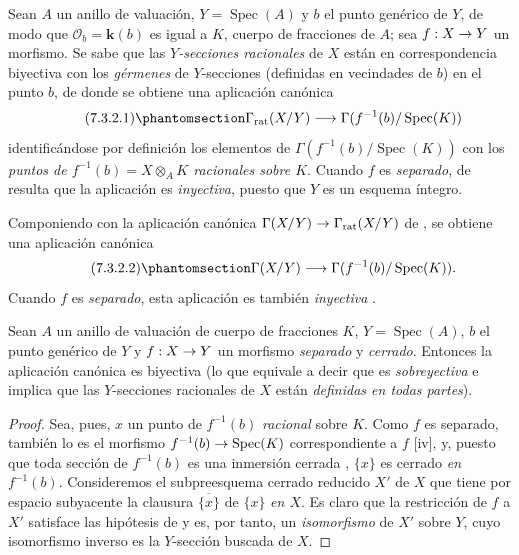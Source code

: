 \documentclass[oneside,10pt]{amsart}
\makeatletter
\newcommand{\ega@arrow}[2]{\mathchoice{#1}{#2}{#2}{#2}}
\renewcommand{\to}{\ega@arrow{\longrightarrow}{\rightarrow}}
\let\EGAOriginalLabel\label
\renewcommand{\label}[1]{\phantomsection\EGAOriginalLabel{#1}}
\makeatother
\begin{document}
\begin{env}[7.3.2]
\label{II.7.3.2-fr}
Sean $A$ un anillo de valuación, $Y=\operatorname{Spec}(A)$ y $b$ el punto genérico de $Y$, de modo que $\mathcal{O}_b=\boldsymbol{k}(b)$ es igual a $K$, cuerpo de fracciones de $A$;
sea $f:X\to Y$ un morfismo.
Se sabe  que las \emph{$Y$-secciones racionales} de $X$ están en correspondencia biyectiva con los \emph{gérmenes} de $Y$-secciones (definidas en vecindades de $b$) en el punto $b$, de donde se obtiene una aplicación canónica
\[
\tag{7.3.2.1}
\label{II.7.3.2.1-fr}
\Gamma_{\mathrm{rat}}(X/Y)\longrightarrow
\Gamma(f^{-1}(b)/\operatorname{Spec}(K))
\]
identificándose por definición  los elementos de $\Gamma(f^{-1}(b)/\operatorname{Spec}(K))$ con los \emph{puntos de $f^{-1}(b)=X\otimes_AK$ racionales sobre $K$}.
Cuando $f$ es \emph{separado}, de  resulta que la aplicación  es \emph{inyectiva}, puesto que $Y$ es un esquema íntegro.

Componiendo  con la aplicación canónica
$\Gamma(X/Y)\to\Gamma_{\mathrm{rat}}(X/Y)$
de , se obtiene una aplicación canónica
\[
\tag{7.3.2.2}
\label{II.7.3.2.2-fr}
\Gamma(X/Y)\longrightarrow \Gamma(f^{-1}(b)/\operatorname{Spec}(K)).
\]
Cuando $f$ es \emph{separado}, esta aplicación es también \emph{inyectiva} .
\end{env}


\begin{proposition}[7.3.3]
\label{II.7.3.3-fr}
Sean $A$ un anillo de valuación de cuerpo de fracciones $K$, $Y=\operatorname{Spec}(A)$, $b$ el punto genérico de $Y$ y $f:X\to Y$ un morfismo \emph{separado} y \emph{cerrado}.
Entonces la aplicación canónica  es biyectiva \textup{(lo que equivale a decir que es \emph{sobreyectiva} e implica que las $Y$-secciones racionales de $X$ están \emph{definidas en todas partes})}.
\end{proposition}

\begin{proof}
Sea, pues, $x$ un punto de $f^{-1}(b)$ \emph{racional} sobre $K$.
Como $f$ es separado, también lo es el morfismo $f^{-1}(b)\to\operatorname{Spec}(K)$ correspondiente a $f$ [iv], y, puesto que toda sección de $f^{-1}(b)$ es una inmersión cerrada , $\{x\}$ es cerrado \emph{en $f^{-1}(b)$}.
Consideremos el subpreesquema cerrado reducido $X'$ de $X$ que tiene por espacio subyacente la clausura $\overline{\{x\}}$ de $\{x\}$ \emph{en $X$}.
Es claro que la restricción de $f$ a $X'$ satisface las hipótesis de  y es, por tanto, un \emph{isomorfismo} de $X'$ sobre $Y$, cuyo isomorfismo inverso es la $Y$-sección buscada de $X$.
\end{proof}
\end{document}
